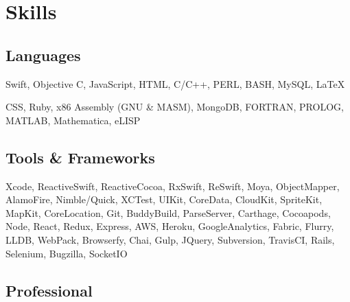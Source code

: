 \documentclass[]{jhearn-resume}
\begin{document}
\hfill
\begin{minipage}[t]{0.34\textwidth} 

\section{Skills}
\subsection{Languages}
Swift, Objective C, JavaScript, HTML, C/C++, PERL, BASH, MySQL,
 \LaTeX \par
{}
CSS, Ruby, x86 Assembly (GNU \& MASM), MongoDB, FORTRAN, PROLOG, MATLAB, Mathematica, eLISP \\
\vspace{\topsep}

\subsection{Tools \& Frameworks}
Xcode, ReactiveSwift, ReactiveCocoa, RxSwift, ReSwift, Moya, ObjectMapper, AlamoFire, Nimble/Quick, XCTest, UIKit, CoreData, CloudKit, SpriteKit, MapKit, CoreLocation, Git, BuddyBuild, ParseServer, Carthage, Cocoapods, Node, React, Redux, Express, AWS, Heroku, GoogleAnalytics, Fabric, Flurry, LLDB,  WebPack, Browserfy, Chai, Gulp, JQuery, Subversion, TravisCI, Rails, Selenium, Bugzilla, SocketIO
\sectionsep

\subsection{Professional}
\begin{lightemize}
\end{lightemize}
\sectionsep


\end{minipage}
\end{document}

